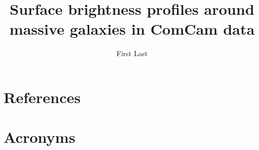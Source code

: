 \documentclass[SE,lsstdraft,authoryear,toc]{lsstdoc}
\title{Surface brightness profiles around massive galaxies in ComCam data}
\author{%
First Last
}
\date{\vcsDate}
\begin{document}
\maketitle


\appendix
\section{References} \label{sec:bib}
\renewcommand{\refname}{} %


\section{Acronyms} \label{sec:acronyms}

\end{document}
